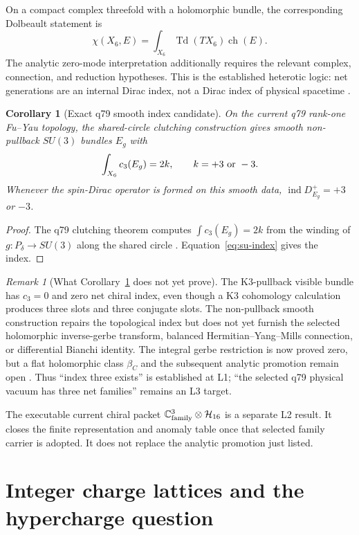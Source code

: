 \documentclass[11pt]{article}
\theoremstyle{plain}
\newtheorem{corollary}[theorem]{Corollary}
\theoremstyle{definition}
\theoremstyle{remark}
\newtheorem{remark}[theorem]{Remark}
\newcommand{\C}{\mathbb{C}}
\newcommand{\ind}{\operatorname{ind}}
\begin{document}
On a compact complex threefold with a holomorphic bundle, the corresponding
Dolbeault statement is
\[
 \chi(X_6,E)=\int_{X_6}\operatorname{Td}(TX_6)\operatorname{ch}(E).
\]
The analytic zero-mode interpretation additionally requires the relevant
complex, connection, and reduction hypotheses. This is the established
heterotic logic: net generations are an internal Dirac index, not a Dirac
index of physical spacetime \cite{CandelasEtAl1985}.

\begin{corollary}[Exact q79 smooth index candidate]
\label{cor:q79-index}
On the current q79 rank-one Fu--Yau topology, the shared-circle clutching
construction gives smooth non-pullback $SU(3)$ bundles $E_g$ with
\[
 \int_{X_6}c_3(E_g)=2k,\qquad k=+3\ \hbox{or}\ -3.
\]
Whenever the spin-Dirac operator is formed on this smooth data,
$\ind D_{E_g}^+=+3$ or $-3$.
\end{corollary}

\begin{proof}
The q79 clutching theorem computes $\int c_3(E_g)=2k$ from the winding of
$g:P_\delta\to SU(3)$ along the shared circle
\cite{MTTq79Chiral}. Equation~\eqref{eq:su-index} gives the index.
\end{proof}

\begin{remark}[What Corollary~\ref{cor:q79-index} does not yet prove]
The K3-pullback visible bundle has $c_3=0$ and zero net chiral index, even
though a K3 cohomology calculation produces three slots and three conjugate
slots. The non-pullback smooth construction repairs the topological index but
does not yet furnish the selected holomorphic inverse-gerbe transform,
balanced Hermitian--Yang--Mills connection, or differential Bianchi identity.
The integral gerbe restriction is now proved zero, but a flat holomorphic class
$\beta_C$ and the subsequent analytic promotion remain open
\cite{MTTq79Gerbe}. Thus ``index three exists'' is established at L1; ``the
selected q79 physical vacuum has three net families'' remains an L3 target.
\end{remark}

The executable current chiral packet
$\C^3_{\rm family}\otimes\mathcal H_{16}$ is a separate L2 result. It closes
the finite representation and anomaly table once that selected family carrier
is adopted. It does not replace the analytic promotion just listed.

\section{Integer charge lattices and the hypercharge question}
\end{document}
